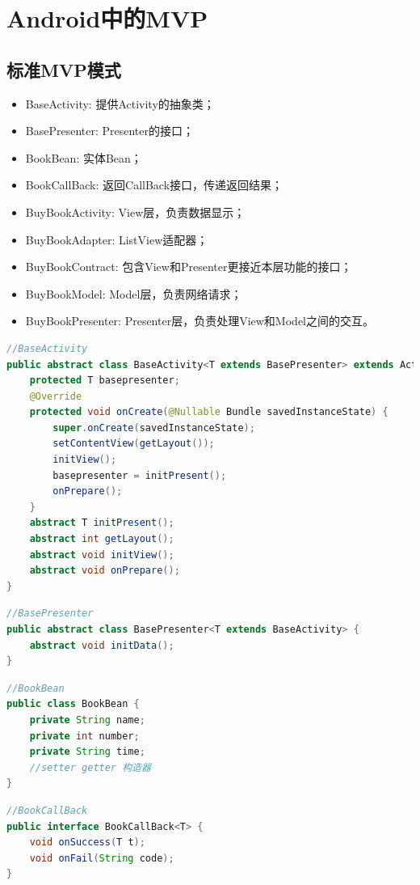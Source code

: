 \documentclass[a4paper,12pt]{ctexart}
\begin{document}
	\section{Android中的MVP}
\subsection{标准MVP模式}
\begin{itemize}
	\item BaseActivity: 提供Activity的抽象类；
	\item BasePresenter: Presenter的接口；
	\item BookBean: 实体Bean；
	\item BookCallBack: 返回CallBack接口，传递返回结果；
	\item BuyBookActivity: View层，负责数据显示；
	\item BuyBookAdapter: ListView适配器；
	\item BuyBookContract: 包含View和Presenter更接近本层功能的接口；
	\item BuyBookModel: Model层，负责网络请求；
	\item BuyBookPresenter: Presenter层，负责处理View和Model之间的交互。
\end{itemize}
\begin{lstlisting}[language=java]
//BaseActivity
public abstract class BaseActivity<T extends BasePresenter> extends Activity {
	protected T basepresenter;
	@Override
	protected void onCreate(@Nullable Bundle savedInstanceState) {
		super.onCreate(savedInstanceState);
		setContentView(getLayout());
		initView();
		basepresenter = initPresent();
		onPrepare();
	}
	abstract T initPresent();
	abstract int getLayout();
	abstract void initView();
	abstract void onPrepare();
}
\end{lstlisting}
\begin{lstlisting}[language=java]
//BasePresenter
public abstract class BasePresenter<T extends BaseActivity> {
	abstract void initData();
}
\end{lstlisting}
\begin{lstlisting}[language=java]
//BookBean
public class BookBean {
	private String name;
	private int number;
	private String time;
	//setter getter 构造器
}
\end{lstlisting}
\begin{lstlisting}[language=java]
//BookCallBack
public interface BookCallBack<T> {
	void onSuccess(T t);
	void onFail(String code);
}
\end{lstlisting}
\end{document}
